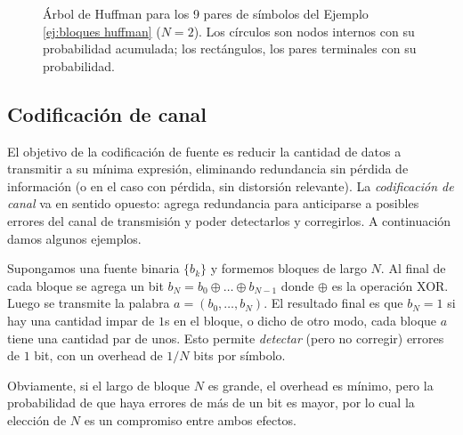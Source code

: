 \begin{figure}[htbp]
    \caption{Árbol de Huffman para los 9 pares de símbolos del Ejemplo \ref{ej:bloques huffman} ($N=2$). Los círculos son nodos internos con su probabilidad acumulada; los rectángulos, los pares terminales con su probabilidad.}
    \label{fig:huffman bloques}
\end{figure}


\subsection{Codificación de canal}

El objetivo de la codificación de fuente es reducir la cantidad de datos a transmitir a su mínima expresión, eliminando redundancia sin pérdida de información (o en el caso con pérdida, sin distorsión relevante). La \emph{codificación de canal} va en sentido opuesto: agrega redundancia para anticiparse a posibles errores del canal de transmisión y poder detectarlos y corregirlos. A continuación damos algunos ejemplos.

\begin{ejemplo}\label{ej:paridad}
    Supongamos una fuente binaria $\{b_k\}$ y formemos bloques de largo $N$. Al final de cada bloque se agrega un bit $b_N = b_0 \oplus \ldots \oplus b_{N-1}$ donde $\oplus$ es la operación XOR. Luego se transmite la palabra $a = (b_0,\ldots,b_N)$. El resultado final es que $b_N=1$ si hay una cantidad impar de $1$s en el bloque, o dicho de otro modo, cada bloque $a$ tiene una cantidad par de unos. Esto permite \emph{detectar} (pero no corregir) errores de $1$ bit, con un overhead de $1/N$ bits por símbolo.

    Obviamente, si el largo de bloque $N$ es grande, el overhead es mínimo, pero la probabilidad de que haya errores de más de un bit es mayor, por lo cual la elección de $N$ es un compromiso entre ambos efectos.
\end{ejemplo}


